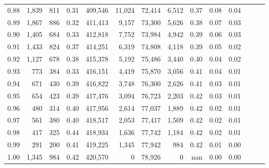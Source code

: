 \begin{tabular}{rrrrrrrrrrrrrr}
0.88 &   1,839 &    811 &  0.31 &  409,546 &   11,024 &  72,414 &   6,512 &  0.37 &  0.08 &      0.04 \\
0.89 &   1,867 &    886 &  0.32 &  411,413 &    9,157 &  73,300 &   5,626 &  0.38 &  0.07 &      0.03 \\
0.90 &   1,405 &    684 &  0.33 &  412,818 &    7,752 &  73,984 &   4,942 &  0.39 &  0.06 &      0.03 \\
0.91 &   1,433 &    824 &  0.37 &  414,251 &    6,319 &  74,808 &   4,118 &  0.39 &  0.05 &      0.02 \\
0.92 &   1,127 &    678 &  0.38 &  415,378 &    5,192 &  75,486 &   3,440 &  0.40 &  0.04 &      0.02 \\
0.93 &     773 &    384 &  0.33 &  416,151 &    4,419 &  75,870 &   3,056 &  0.41 &  0.04 &      0.01 \\
0.94 &     671 &    430 &  0.39 &  416,822 &    3,748 &  76,300 &   2,626 &  0.41 &  0.03 &      0.01 \\
0.95 &     654 &    423 &  0.39 &  417,476 &    3,094 &  76,723 &   2,203 &  0.42 &  0.03 &      0.01 \\
0.96 &     480 &    314 &  0.40 &  417,956 &    2,614 &  77,037 &   1,889 &  0.42 &  0.02 &      0.01 \\
0.97 &     561 &    380 &  0.40 &  418,517 &    2,053 &  77,417 &   1,509 &  0.42 &  0.02 &      0.01 \\
0.98 &     417 &    325 &  0.44 &  418,934 &    1,636 &  77,742 &   1,184 &  0.42 &  0.02 &      0.01 \\
0.99 &     291 &    200 &  0.41 &  419,225 &    1,345 &  77,942 &     984 &  0.42 &  0.01 &      0.00 \\
1.00 &   1,345 &    984 &  0.42 &  420,570 &        0 &  78,926 &       0 &   nan &  0.00 &      0.00 \\
\bottomrule
\end{tabular}
